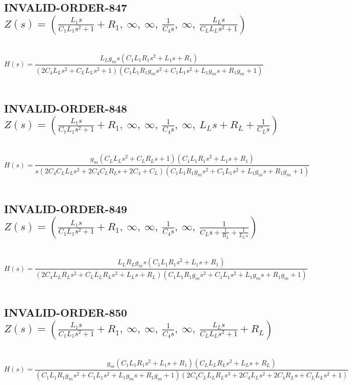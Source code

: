 \documentclass{article}
\begin{document}
\subsection{INVALID-ORDER-847 $Z(s) = \left( \frac{L_{1} s}{C_{1} L_{1} s^{2} + 1} + R_{1}, \  \infty, \  \infty, \  \frac{1}{C_{4} s}, \  \infty, \  \frac{L_{L} s}{C_{L} L_{L} s^{2} + 1}\right)$ } \ 
\textbf{\[H(s) = \frac{L_{L} g_{m} s \left(C_{1} L_{1} R_{1} s^{2} + L_{1} s + R_{1}\right)}{\left(2 C_{4} L_{L} s^{2} + C_{L} L_{L} s^{2} + 1\right) \left(C_{1} L_{1} R_{1} g_{m} s^{2} + C_{1} L_{1} s^{2} + L_{1} g_{m} s + R_{1} g_{m} + 1\right)}\] } \ 
\subsection{INVALID-ORDER-848 $Z(s) = \left( \frac{L_{1} s}{C_{1} L_{1} s^{2} + 1} + R_{1}, \  \infty, \  \infty, \  \frac{1}{C_{4} s}, \  \infty, \  L_{L} s + R_{L} + \frac{1}{C_{L} s}\right)$ } \ 
\textbf{\[H(s) = \frac{g_{m} \left(C_{L} L_{L} s^{2} + C_{L} R_{L} s + 1\right) \left(C_{1} L_{1} R_{1} s^{2} + L_{1} s + R_{1}\right)}{s \left(2 C_{4} C_{L} L_{L} s^{2} + 2 C_{4} C_{L} R_{L} s + 2 C_{4} + C_{L}\right) \left(C_{1} L_{1} R_{1} g_{m} s^{2} + C_{1} L_{1} s^{2} + L_{1} g_{m} s + R_{1} g_{m} + 1\right)}\] } \ 
\subsection{INVALID-ORDER-849 $Z(s) = \left( \frac{L_{1} s}{C_{1} L_{1} s^{2} + 1} + R_{1}, \  \infty, \  \infty, \  \frac{1}{C_{4} s}, \  \infty, \  \frac{1}{C_{L} s + \frac{1}{R_{L}} + \frac{1}{L_{L} s}}\right)$ } \ 
\textbf{\[H(s) = \frac{L_{L} R_{L} g_{m} s \left(C_{1} L_{1} R_{1} s^{2} + L_{1} s + R_{1}\right)}{\left(2 C_{4} L_{L} R_{L} s^{2} + C_{L} L_{L} R_{L} s^{2} + L_{L} s + R_{L}\right) \left(C_{1} L_{1} R_{1} g_{m} s^{2} + C_{1} L_{1} s^{2} + L_{1} g_{m} s + R_{1} g_{m} + 1\right)}\] } \ 
\subsection{INVALID-ORDER-850 $Z(s) = \left( \frac{L_{1} s}{C_{1} L_{1} s^{2} + 1} + R_{1}, \  \infty, \  \infty, \  \frac{1}{C_{4} s}, \  \infty, \  \frac{L_{L} s}{C_{L} L_{L} s^{2} + 1} + R_{L}\right)$ } \ 
\textbf{\[H(s) = \frac{g_{m} \left(C_{1} L_{1} R_{1} s^{2} + L_{1} s + R_{1}\right) \left(C_{L} L_{L} R_{L} s^{2} + L_{L} s + R_{L}\right)}{\left(C_{1} L_{1} R_{1} g_{m} s^{2} + C_{1} L_{1} s^{2} + L_{1} g_{m} s + R_{1} g_{m} + 1\right) \left(2 C_{4} C_{L} L_{L} R_{L} s^{3} + 2 C_{4} L_{L} s^{2} + 2 C_{4} R_{L} s + C_{L} L_{L} s^{2} + 1\right)}\] } \ 
\end{document}
